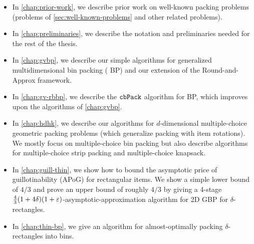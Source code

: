 \begin{itemize}
\item In \cref{chap:prior-work}, we describe prior work on well-known packing problems
    (problems of \cref{sec:well-known-problems} and other related problems).
\item In \cref{chap:preliminaries}, we describe the notation and preliminaries
    needed for the rest of the thesis.
\item In \cref{chap:gvbp}, we describe our simple algorithms for generalized multidimensional
    bin packing ( BP) and our extension of the Round-and-Approx framework.
\item In \cref{chap:gv-rbbp}, we describe the $\operatorname{\mathtt{cbPack}}$ algorithm for  BP,
    which improves upon the algorithms of \cref{chap:gvbp}.
\item In \cref{chap:hdhk}, we describe our algorithms for $d$-dimensional
    multiple-choice geometric packing problems (which generalize packing with item rotations).
    We mostly focus on multiple-choice bin packing but also describe algorithms for
    multiple-choice strip packing and multiple-choice knapsack.
\item In \cref{chap:guill-thin}, we show how to bound the asymptotic price of guillotinability
    (APoG) for \thin{} rectangular items. We show a simple lower bound of $4/3$ and prove an
    upper bound of roughly $4/3$ by giving a 4-stage
    $\frac{4}{3}(1+4\delta)(1+\varepsilon)$-asymptotic-approximation algorithm for 2D GBP
    for $\delta$-\thin{} rectangles.
\item In \cref{chap:thin-bp}, we give an algorithm for almost-optimally packing
    $\delta$-\thin{} rectangles into bins.
\end{itemize}
